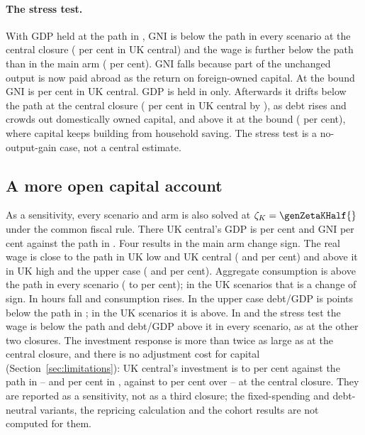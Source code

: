 \paragraph{The stress test.} With GDP held at the path in \genHeadYear{}, GNI is below the path in every scenario at the central closure (\genUkCentralStressGniCentral{} per cent in UK central) and the wage is further below the path than in the main arm (\genUkCentralStressWageCentral{} per cent). GNI falls because part of the unchanged output is now paid abroad as the return on foreign-owned capital. At the bound GNI is \genUkCentralStressGniBound{} per cent in UK central. GDP is held in \genHeadYear{} only. Afterwards it drifts below the path at the central closure (\genUkCentralStressGdpThirtyFiveCentral{} per cent in UK central by \genLastFlowYear{}), as debt rises and crowds out domestically owned capital, and above it at the bound (\genUkCentralStressGdpThirtyFiveBound{} per cent), where capital keeps building from household saving. The stress test is a no-output-gain case, not a central estimate.

\subsection{A more open capital account}
\label{sec:results-half}

As a sensitivity, every scenario and arm is also solved at $\zetaK = \genZetaKHalf{}$ under the common fiscal rule. There UK central's GDP is \genUkCentralMainGdpHalf{} per cent and GNI \genUkCentralMainGniHalf{} per cent against the path in \genHeadYear{}. Four results in the main arm change sign. The real wage is close to the path in UK low and UK central (\genUkLowMainWageHalf{} and \genUkCentralMainWageHalf{} per cent) and above it in UK high and the upper case (\genUkHighMainWageHalf{} and \genKorinekMainWageHalf{} per cent). Aggregate consumption is above the path in every scenario (\genUkLowMainConsumptionHalf{} to \genKorinekMainConsumptionHalf{} per cent); in the UK scenarios that is a change of sign. In \genShockYear{} hours fall and consumption rises. In the upper case debt/GDP is \genKorinekMainDebtPpThirtySixHalfAbs{} points below the path in \genDebtRuleYear{}; in the UK scenarios it is above. In \Flat{} and the stress test the wage is below the path and debt/GDP above it in every scenario, as at the other two closures. The investment response is more than twice as large as at the central closure, and there is no adjustment cost for capital (Section~\ref{sec:limitations}): UK central's investment is \genUkCentralMainInvestmentTwentyEightHalf{} to \genUkCentralMainInvestmentThirtyHalf{} per cent against the path in \genShockYear--\genYearTwoAfterShock{} and \genUkCentralMainInvestmentHalf{} per cent in \genHeadYear{}, against \genUkCentralMainInvestmentTwentyEightCentral{} to \genUkCentralMainInvestmentThirtyCentral{} per cent over \genShockYear--\genYearTwoAfterShock{} at the central closure. They are reported as a sensitivity, not as a third closure; the fixed-spending and debt-neutral variants, the repricing calculation and the cohort results are not computed for them.

